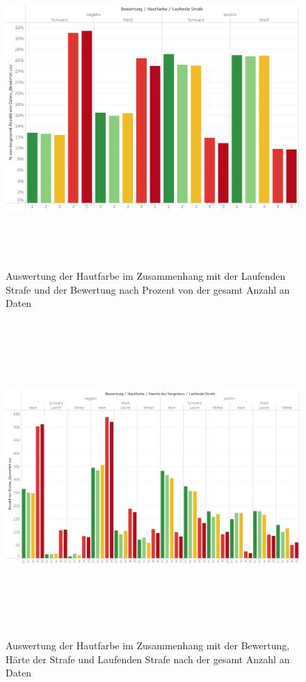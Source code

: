 \documentclass[a4paper,12pt]{report}
\begin{document}
\begin{figure}[!h]
    \centering
    \includegraphics[width=16cm,height=12cm]{Diagramme/SZ1_Tab8.PNG}
    \caption{Auswertung der Hautfarbe im Zusammenhang mit der Laufenden Strafe und der Bewertung nach Prozent von der gesamt Anzahl an Daten}
    \label{fig:SZ1Tab8}
\end{figure}

\begin{figure}[!h]
    \centering
    \includegraphics[width=16cm,height=12cm]{Diagramme/SZ1_Tab9.PNG}
    \caption{Auswertung der Hautfarbe im Zusammenhang mit der Bewertung, Härte der Strafe und Laufenden Strafe nach der gesamt Anzahl an Daten}
    \label{fig:SZ1Tab9}
\end{figure}
\end{document}
